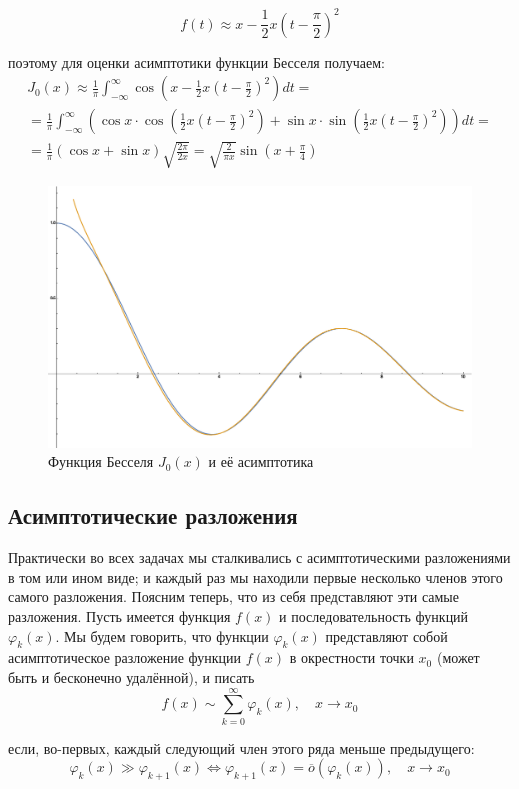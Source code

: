 \documentclass[a4paper,12pt]{article}
\begin{document}
\[
f(t)\approx x-\frac{1}{2}x\left(t-\frac{\pi}{2}\right)^{2}
\]

\noindent
поэтому для оценки асимптотики функции Бесселя получаем:
\begin{multline*}
J_{0}(x)\approx\frac{1}{\pi}\int_{-\infty}^{\infty}\cos\left(x-\frac{1}{2}x\left(t-\frac{\pi}{2}\right)^{2}\right)dt=\\
=\frac{1}{\pi}\int_{-\infty}^{\infty}\left(\cos x\cdot\cos\left(\frac{1}{2}x\left(t-\frac{\pi}{2}\right)^{2}\right)+\sin x\cdot\sin\left(\frac{1}{2}x\left(t-\frac{\pi}{2}\right)^{2}\right)\right)dt=\\
=\frac{1}{\pi}(\cos x+\sin x)\sqrt{\frac{2\pi}{2x}}=\sqrt{\frac{2}{\pi x}}\sin\left(x+\frac{\pi}{4}\right)
\end{multline*}


\begin{figure}[h]
\caption{Функция Бесселя $J_{0}(x)$ и её асимптотика}
\centering
\includegraphics[width=0.65\columnwidth]{besselj.eps}
\end{figure}


\subsection*{Асимптотические разложения}

Практически во всех задачах мы сталкивались с асимптотическими разложениями
в том или ином виде; и каждый раз мы находили первые несколько членов
этого самого разложения. Поясним теперь, что из себя представляют
эти самые разложения. Пусть имеется функция $f(x)$ и последовательность
функций $\varphi_{k}(x)$. Мы будем говорить, что функции $\varphi_{k}(x)$
представляют собой асимптотическое разложение функции $f(x)$ в окрестности
точки $x_{0}$ (может быть и бесконечно удалённой), и писать
\[
f(x)\sim\sum_{k=0}^{\infty}\varphi_{k}(x),\quad x\to x_{0}
\]

\noindent
если, во-первых, каждый следующий член этого ряда меньше предыдущего:
\[
\varphi_{k}(x)\gg\varphi_{k+1}(x)\Leftrightarrow\varphi_{k+1}(x)=\overline{o}(\varphi_{k}(x)),\quad x\to x_{0}
\]
\end{document}
